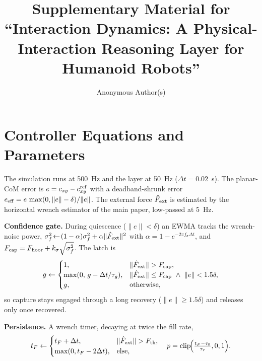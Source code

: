 \documentclass[journal]{IEEEtran}
\begin{document}
\title{Supplementary Material for ``Interaction Dynamics: A Physical-Interaction Reasoning Layer for Humanoid Robots''}

\author{Anonymous Author(s)}


\maketitle

\section{Controller Equations and Parameters}
\label{app:impl}

The simulation runs at 500~Hz and the layer at 50~Hz ($\Delta t=0.02$~s). The planar-CoM error is $e=c_{xy}-c_{xy}^{\rm ref}$ with a deadband-shrunk error $e_{\rm eff}=e\,\max(0,\|e\|-\delta)/\|e\|$. The external force $\hat F_{\rm ext}$ is estimated by the horizontal wrench estimator of the main paper, low-passed at $5$~Hz.

\textbf{Confidence gate.} During quiescence ($\|e\|<\delta$) an EWMA tracks the wrench-noise power, $\sigma_f^2\!\leftarrow\!(1-\alpha)\sigma_f^2+\alpha\|\hat F_{\rm ext}\|^2$ with $\alpha=1-e^{-2\pi f_\sigma\Delta t}$, and $F_{\rm cap}=F_{\rm floor}+k_\sigma\sqrt{\sigma_f^2}$. The latch is
\begin{equation}
g\leftarrow\begin{cases}
1,& \|\hat F_{\rm ext}\|>F_{\rm cap},\\
\max(0,\,g-\Delta t/\tau_g),& \|\hat F_{\rm ext}\|\le F_{\rm cap}\ \wedge\ \|e\|<1.5\delta,\\
g,&\text{otherwise},
\end{cases}
\label{eq:gate}
\end{equation}
so capture stays engaged through a long recovery ($\|e\|\ge1.5\delta$) and releases only once recovered.

\textbf{Persistence.} A wrench timer, decaying at twice the fill rate,
\begin{equation}
t_F\leftarrow\begin{cases}t_F+\Delta t,&\|\hat F_{\rm ext}\|>F_{\rm th},\\ \max(0,t_F-2\Delta t),&\text{else,}\end{cases}
\quad p=\mathrm{clip}\!\Big(\tfrac{t_F-\tau_0}{\tau_r},0,1\Big).
\label{eq:persist}
\end{equation}
\end{document}
